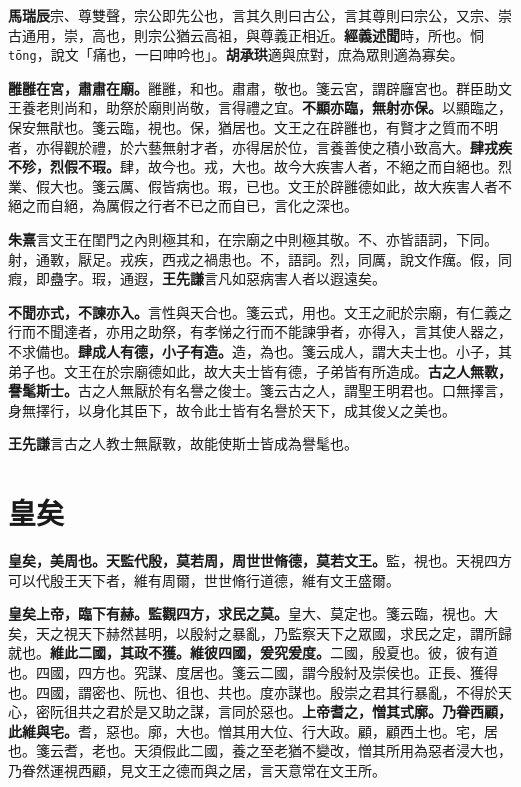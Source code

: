 \begin{quoting}\textbf{馬瑞辰}宗、尊雙聲，宗公即先公也，言其久則曰古公，言其尊則曰宗公，又宗、崇古通用，崇，高也，則宗公猶云高祖，與尊義正相近。\textbf{經義述聞}時，所也。恫 \texttt{tōng}，說文「痛也，一曰呻吟也」。\textbf{胡承珙}適與庶對，庶為眾則適為寡矣。\end{quoting}

\textbf{雝雝在宮，肅肅在廟。}{\footnotesize 雝雝，和也。肅肅，敬也。箋云宮，謂辟廱宮也。群臣助文王養老則尚和，助祭於廟則尚敬，言得禮之宜。}\textbf{不顯亦臨，無射亦保。}{\footnotesize 以顯臨之，保安無猒也。箋云臨，視也。保，猶居也。文王之在辟雝也，有賢才之質而不明者，亦得觀於禮，於六藝無射才者，亦得居於位，言養善使之積小致高大。}\textbf{肆戎疾不殄，烈假不瑕。}{\footnotesize 肆，故今也。戎，大也。故今大疾害人者，不絕之而自絕也。烈業、假大也。箋云厲、假皆病也。瑕，已也。文王於辟雝德如此，故大疾害人者不絕之而自絕，為厲假之行者不已之而自已，言化之深也。}

\begin{quoting}\textbf{朱熹}言文王在閨門之內則極其和，在宗廟之中則極其敬。不、亦皆語詞，下同。射，通斁，厭足。戎疾，西戎之禍患也。不，語詞。烈，同厲，說文作癘。假，同瘕，即蠱字。瑕，通遐，\textbf{王先謙}言凡如惡病害人者以遐遠矣。\end{quoting}

\textbf{不聞亦式，不諫亦入。}{\footnotesize 言性與天合也。箋云式，用也。文王之祀於宗廟，有仁義之行而不聞達者，亦用之助祭，有孝悌之行而不能諫爭者，亦得入，言其使人器之，不求備也。}\textbf{肆成人有德，小子有造。}{\footnotesize 造，為也。箋云成人，謂大夫士也。小子，其弟子也。文王在於宗廟德如此，故大夫士皆有德，子弟皆有所造成。}\textbf{古之人無斁，譽髦斯士。}{\footnotesize 古之人無厭於有名譽之俊士。箋云古之人，謂聖王明君也。口無擇言，身無擇行，以身化其臣下，故令此士皆有名譽於天下，成其俊乂之美也。}

\begin{quoting}\textbf{王先謙}言古之人教士無厭斁，故能使斯士皆成為譽髦也。\end{quoting}

\section{皇矣}


\textbf{皇矣，美周也。天監代殷，莫若周，周世世脩德，莫若文王。}{\footnotesize 監，視也。天視四方可以代殷王天下者，維有周爾，世世脩行道德，維有文王盛爾。}

\textbf{皇矣上帝，臨下有赫。監觀四方，求民之莫。}{\footnotesize 皇大、莫定也。箋云臨，視也。大矣，天之視天下赫然甚明，以殷紂之暴亂，乃監察天下之眾國，求民之定，謂所歸就也。}\textbf{維此二國，其政不獲。維彼四國，爰究爰度。}{\footnotesize 二國，殷夏也。彼，彼有道也。四國，四方也。究謀、度居也。箋云二國，謂今殷紂及崇侯也。正長、獲得也。四國，謂密也、阮也、徂也、共也。度亦謀也。殷崇之君其行暴亂，不得於天心，密阮徂共之君於是又助之謀，言同於惡也。}\textbf{上帝耆之，憎其式廓。乃眷西顧，此維與宅。}{\footnotesize 耆，惡也。廓，大也。憎其用大位、行大政。顧，顧西土也。宅，居也。箋云耆，老也。天須假此二國，養之至老猶不變改，憎其所用為惡者浸大也，乃眷然運視西顧，見文王之德而與之居，言天意常在文王所。}

